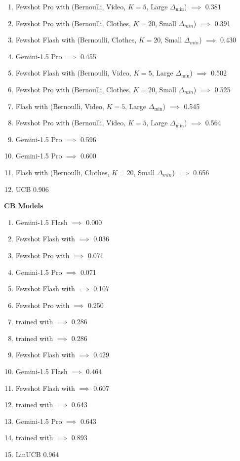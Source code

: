 \begin{enumerate}
    \item Fewshot Pro with (Bernoulli, Video, $K=5$, Large $\Delta_{\min}$) $\implies$ \RH \hfill 0.381
    \item Fewshot Pro with  (Bernoulli, Clothes, $K=20$, Small $\Delta_{min}$) $\implies$ \RH \hfill 0.391
    \item Fewshot Flash with  (Bernoulli, Clothes, $K=20$, Small $\Delta_{min}$) $\implies$ \SH \hfill 0.430
    \item Gemini-1.5 Pro $\implies$ \RH \hfill 0.455
    \item Fewshot Flash with (Bernoulli, Video, $K=5$, Large $\Delta_{\min}$) $\implies$ \SH \hfill 0.502
    \item Fewshot Pro with  (Bernoulli, Clothes, $K=20$, Small $\Delta_{min}$) $\implies$ \SH \hfill 0.525
    \item \OFT Flash with (Bernoulli, Video, $K=5$, Large $\Delta_{\min}$) \RH $\implies$ \RH \hfill 0.545
    \item Fewshot Pro with (Bernoulli, Video, $K=5$, Large $\Delta_{\min}$) $\implies$ \SH \hfill 0.564
    \item Gemini-1.5 Pro $\implies$ \AG \hfill 0.596
    \item Gemini-1.5 Pro $\implies$ \SH \hfill 0.600
    \item \OFT Flash with  (Bernoulli, Clothes, $K=20$, Small $\Delta_{min}$) \RH $\implies$ \RH \hfill 0.656
    \item UCB \hfill 0.906
\end{enumerate}

\textbf{CB Models}

\begin{enumerate}
    \item Gemini-1.5 Flash $\implies$ \RH \hfill 0.000
    \item Fewshot Flash with \RH $\implies$ \RH \hfill 0.036
    \item Fewshot Pro with \RH $\implies$ \RH \hfill 0.071
    \item Gemini-1.5 Pro $\implies$ \RH \hfill 0.071
    \item Fewshot Flash with \RH $\implies$ \RH \hfill 0.107
    \item Fewshot Pro with \RH $\implies$ \AG \hfill 0.250
    \item \OFT trained with \RH $\implies$ \RH \hfill 0.286
    \item \OFT trained with \AG $\implies$ \RH \hfill 0.286
    \item Fewshot Flash with \RH $\implies$ \AG \hfill 0.429
    \item Gemini-1.5 Flash $\implies$ \AG \hfill 0.464
    \item Fewshot Flash with \AG $\implies$ \AG \hfill 0.607
    \item \OFT trained with \RH $\implies$ \AG \hfill 0.643
    \item Gemini-1.5 Pro $\implies$ \AG \hfill  0.643
    \item \OFT trained with \AG $\implies$ \AG \hfill  0.893
    \item LinUCB \hfill 0.964
\end{enumerate}



